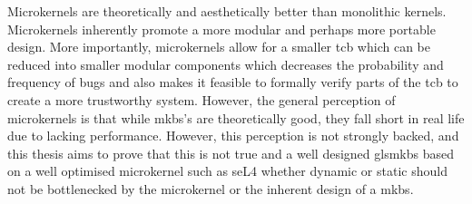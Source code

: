 \documentclass[../thesis.tex]{subfiles}
\begin{document}
Microkernels are theoretically and aesthetically better than monolithic kernels. Microkernels inherently promote a more modular and perhaps more portable design. More importantly, microkernels allow for a smaller \gls{tcb} which can be reduced into smaller modular components which decreases the probability and frequency of bugs and also makes it feasible to formally verify parts of the \gls{tcb} to create a more trustworthy system. However, the general perception of microkernels is that while \gls{mkbs}'s are theoretically good, they fall short in real life due to lacking performance. However, this perception is not strongly backed, and this thesis aims to prove that this is not true and a well designed gls{mkbs} based on a well optimised microkernel such as seL4 whether dynamic or static should not be bottlenecked by the microkernel or the inherent design of a \gls{mkbs}. 
\end{document}
